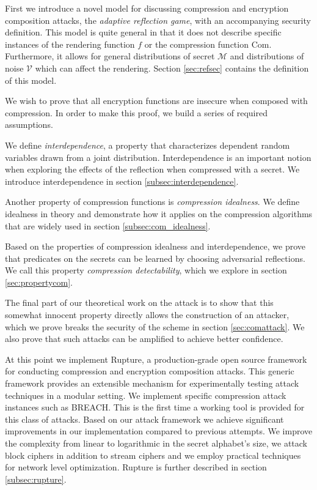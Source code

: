 \documentclass[conference, letterpaper, 10pt]{IEEEtran}
\begin{document}
First we introduce a novel model for discussing compression and encryption
composition attacks, the \textit{adaptive reflection game}, with an accompanying
security definition. This model is quite general in that it does not describe
specific instances of the rendering function $f$ or the compression function
$\textrm{Com}$. Furthermore, it allows for general distributions of secret $\mathcal{M}$
and distributions of noise $\mathcal{V}$ which can affect the rendering. Section
\ref{sec:refsec} contains the definition of this model.

We wish to prove that all encryption functions are insecure when composed with
compression. In order to make this proof, we build a series of required
assumptions.

We define \textit{interdependence}, a property that characterizes dependent
random variables drawn from a joint distribution. Interdependence is an
important notion when exploring the effects of the reflection when compressed
with a secret. We introduce interdependence in section
\ref{subsec:interdependence}.

Another property of compression functions is \textit{compression idealness}. We
define idealness in theory and demonstrate how it applies on the compression
algorithms that are widely used in section \ref{subsec:com_idealness}.

Based on the properties of compression idealness and interdependence, we prove
that predicates on the secrets can be learned by choosing adversarial
reflections. We call this property \textit{compression detectability}, which we
explore in section \ref{sec:propertycom}.

The final part of our theoretical work on the attack is to show that this
somewhat innocent property directly allows the construction of an attacker,
which we prove breaks the security of the scheme in section
\ref{sec:comattack}. We also prove that such attacks can be amplified to
achieve better confidence.

At this point we implement Rupture\footnotemark[1], a production-grade open
source framework for conducting compression and encryption composition attacks.
This generic framework provides an extensible mechanism for experimentally
testing attack techniques in a modular setting. We implement specific
compression attack instances such as BREACH. This is the first time a working
tool is provided for this class of attacks.  Based on our attack framework we
achieve significant improvements in our implementation compared to previous
attempts. We improve the complexity from linear to logarithmic in the secret
alphabet's size, we attack block ciphers in addition to stream ciphers and we
employ practical techniques for network level optimization.  Rupture is further
described in section \ref{subsec:rupture}.
\end{document}
